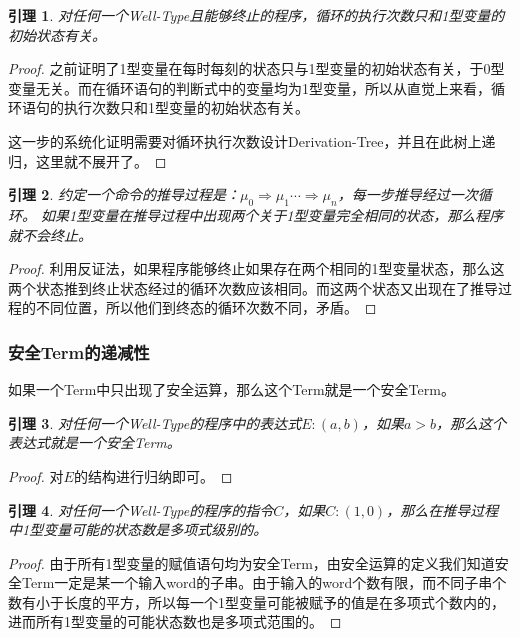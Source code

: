 \documentclass{ctexart}
\newtheorem{lemma}{引理}
\newtheorem{proof}{证明}
\begin{document}
\begin{lemma}
对任何一个Well-Type且能够终止的程序，循环的执行次数只和1型变量的初始状态有关。
\end{lemma}
\begin{proof}
之前证明了1型变量在每时每刻的状态只与1型变量的初始状态有关，于0型变量无关。而在循环语句的判断式中的变量均为1型变量，所以从直觉上来看，循环语句的执行次数只和1型变量的初始状态有关。

这一步的系统化证明需要对循环执行次数设计Derivation-Tree，并且在此树上递归，这里就不展开了。
\end{proof}
\begin{lemma}
约定一个命令的推导过程是：$\mu_0\Rightarrow\mu_1\cdots\Rightarrow\mu_n$，每一步推导经过一次循环。
如果1型变量在推导过程中出现两个关于1型变量完全相同的状态，那么程序就不会终止。
\end{lemma}
\begin{proof}
利用反证法，如果程序能够终止如果存在两个相同的1型变量状态，那么这两个状态推到终止状态经过的循环次数应该相同。而这两个状态又出现在了推导过程的不同位置，所以他们到终态的循环次数不同，矛盾。
\end{proof}
\subsubsection{安全Term的递减性}
如果一个Term中只出现了安全运算，那么这个Term就是一个安全Term。
\begin{lemma}
对任何一个Well-Type的程序中的表达式$E:(a,b)$，如果$a>b$，那么这个表达式就是一个安全Term。
\end{lemma}
\begin{proof}
对$E$的结构进行归纳即可。
\end{proof}
\begin{lemma}
对任何一个Well-Type的程序的指令$C$，如果$C:(1,0)$，那么在推导过程中1型变量可能的状态数是多项式级别的。
\end{lemma}
\begin{proof}
由于所有1型变量的赋值语句均为安全Term，由安全运算的定义我们知道安全Term一定是某一个输入word的子串。由于输入的word个数有限，而不同子串个数有小于长度的平方，所以每一个1型变量可能被赋予的值是在多项式个数内的，进而所有1型变量的可能状态数也是多项式范围的。
\end{proof}
\end{document}
